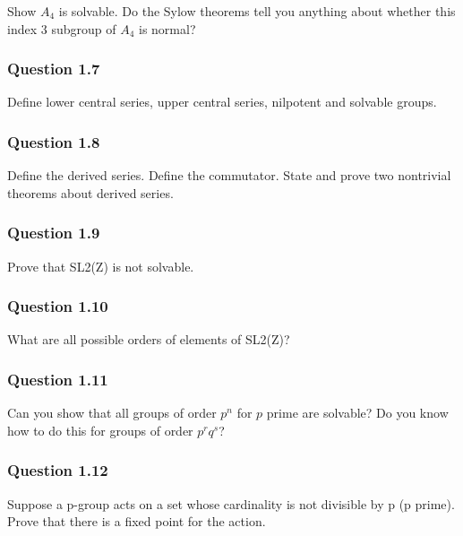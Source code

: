 Show \(A_4\) is solvable. Do the Sylow theorems tell you anything about
whether this index 3 subgroup of \(A_4\) is normal?

\hypertarget{question-1.7}{%
\subsubsection{Question 1.7}\label{question-1.7}}

Define lower central series, upper central series, nilpotent and
solvable groups.

\hypertarget{question-1.8}{%
\subsubsection{Question 1.8}\label{question-1.8}}

Define the derived series. Define the commutator. State and prove two
nontrivial theorems about derived series.

\hypertarget{question-1.9}{%
\subsubsection{Question 1.9}\label{question-1.9}}

Prove that SL2(Z) is not solvable.

\hypertarget{question-1.10}{%
\subsubsection{Question 1.10}\label{question-1.10}}

What are all possible orders of elements of SL2(Z)?

\hypertarget{question-1.11}{%
\subsubsection{Question 1.11}\label{question-1.11}}

Can you show that all groups of order \(p^n\) for \(p\) prime are
solvable? Do you know how to do this for groups of order \(p^r q^s\)?

\hypertarget{question-1.12}{%
\subsubsection{Question 1.12}\label{question-1.12}}

Suppose a p-group acts on a set whose cardinality is not divisible by p
(p prime). Prove that there is a fixed point for the action.

